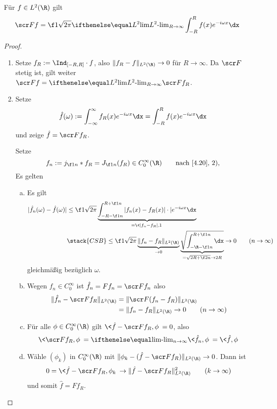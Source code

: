 \begin{st} \label{4.23}
	Für $f \in L^2(\R)$ gilt
	\[
		\scr F f = \f 1{\sqrt{2\pi}} \lim[L^2]_{R\to\infty} \int_{-R}^R f(x)e^{-i\omega x} \dx
	\]
	\begin{proof}
		\begin{enumerate}[1)]
			\item
				Setze $f_R := \Ind_{[-R,R]} \cdot f$, also $\|f_R - f\|_{L^2(\R)} \to 0$ für $R \to \infty$.
				Da $\scr F$ stetig ist, gilt weiter $\scr F f = \lim[L^2]_{R\to\infty} \scr F f_R$.
			\item
				Setze
				\[
					\hat f(\omega)  := \int_{-\infty}^\infty f_R(x) e^{-i\omega x} \dx
					= \int_{-R}^R f(x) e^{-i\omega x} \dx
				\]
				und zeige $\hat f = \scr F f_R$.

				Setze
				\[
					f_n := j_{\f 1n} \ast f_R
					= J_{\f 1n} (f_R) \in C_0^\infty(\R) \qquad \text{nach \ref{4.20}, 2)},
				\]
				Es gelten
				\begin{enumerate}[a)]
					\item
						Es gilt
						\begin{align*}
							|\hat f_n(\omega) - \hat f(\omega)|
							& \le \f 1{\sqrt{2\pi}} \underbrace{\int_{-R-\f 1n}^{R+\f 1n} |f_n(x) - f_R(x)|\cdot |e^{-i\omega x} \dx}_{= \<|f_n-f_R|,1\>} \\
							&\stack{CSB}\le \f 1{\sqrt{2\pi}} \underbrace{\|f_n - f_R\|_{L^2(\R)}}_{\to 0} \underbrace{\sqrt{\int_{-\R-\f 1n}^{R+\f 1n} \dx}}_{= \sqrt{2R + \f 2n} \to 2R}
							\to 0 \qquad (n\to \infty)
						\end{align*}
						gleichmäßig bezüglich $\omega$.
					\item
						Wegen $f_n \in C_0^\infty$ ist $\hat f_n = F f_n = \scr F f_n$ also
						\begin{align*}
							\|\hat f_n - \scr F f_R\|_{L^2(\R)}
							&= \|\scr F(f_n -f_R)\|_{L^2(\R)} \\
							&= \|f_n - f_R\|_{L^2(\R)}
							\to 0 \qquad (n\to \infty)
						\end{align*}
					\item
						Für alle $\phi \in C_0^\infty(\R)$ gilt $\<\hat f - \scr F f_R, \phi\> = 0$, also
						\begin{align*}
							\< \scr F f_R, \phi\> = \lim_{n\to\infty} \<\hat f_n, \phi\>
							= \<\hat f, \phi\>
						\end{align*}
					\item
						Wähle $(\phi_k)$ in $C_0^\infty(\R)$ mit $\|\phi_k - (\hat f - \scr F f_R)\|_{L^2(\R)} \to 0$.
						Dann ist
						\[
							0 = \<\hat f - \scr F f_R, \phi_k\> \to \|\hat f - \scr F f_R\|_{L^2(\R)}^2 \qquad (k\to \infty)
						\]
						und somit $\hat f = F f_R$.
				\end{enumerate}
		\end{enumerate}

	\end{proof}
\end{st}

